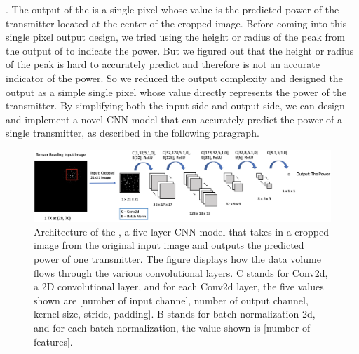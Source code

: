 .
The output of the \power is a single pixel whose value is the predicted power of the transmitter located at the center of the cropped image.
Before coming into this single pixel output design, we tried using the height or radius of the peak from the output of \imgimg to indicate the power. 
But we figured out that the height or radius of the peak is hard to accurately predict and therefore is not an accurate indicator of the power.
So we reduced the output complexity and designed the output as a simple single pixel whose value directly represents the power of the transmitter.
By simplifying both the input side and output side, we can design and implement a novel CNN model that can accurately predict the power of a single transmitter, as described in the following paragraph.

\begin{figure}
    \centering
    \includegraphics[width=\textwidth]{chapters/wowmom-pmc/figures/power_predictor.png}
    \caption{Architecture of the \power, a five-layer CNN model that takes in a cropped image from the original input image and outputs the predicted power of one transmitter. The figure displays how the data volume flows through the various convolutional layers. C stands for Conv2d, a 2D convolutional layer, and for each Conv2d layer, the five values shown are [number of input channel, number of output channel, kernel size, stride, padding]. B stands for batch normalization 2d, and for each batch normalization, the value shown is [number-of-features].}
    \label{fig:power_predict}
\end{figure}


